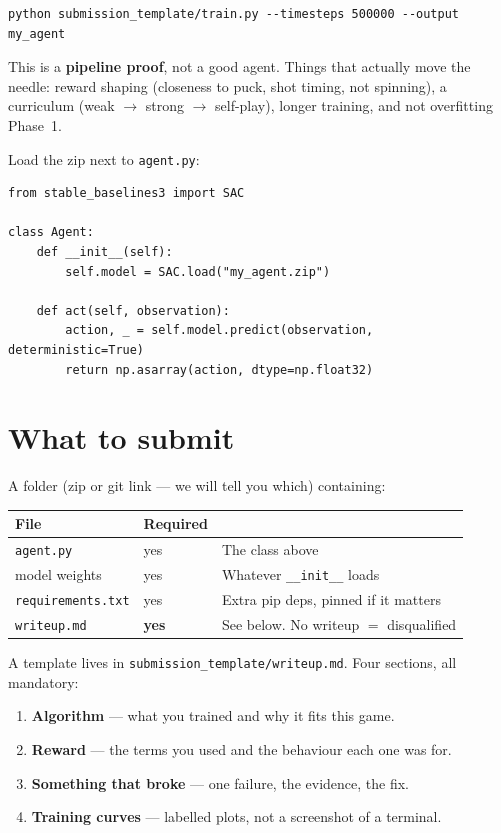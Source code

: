 \documentclass[11pt,a4paper]{article}
\begin{document}
\begin{lstlisting}
python submission_template/train.py --timesteps 500000 --output my_agent
\end{lstlisting}

This is a \textbf{pipeline proof}, not a good agent. Things that actually move the needle: reward shaping (closeness to puck, shot timing, not spinning), a curriculum (weak $\to$ strong $\to$ self-play), longer training, and not overfitting Phase~1.

Load the zip next to \texttt{agent.py}:

\begin{lstlisting}
from stable_baselines3 import SAC

class Agent:
    def __init__(self):
        self.model = SAC.load("my_agent.zip")

    def act(self, observation):
        action, _ = self.model.predict(observation, deterministic=True)
        return np.asarray(action, dtype=np.float32)
\end{lstlisting}

\section{What to submit}

A folder (zip or git link --- we will tell you which) containing:

\begin{center}
\begin{tabular}{@{}ll l@{}}
\toprule
\sffamily\bfseries File & \sffamily\bfseries Required & \sffamily\bfseries \\
\midrule
\texttt{agent.py}         & yes & The class above \\
model weights             & yes & Whatever \texttt{\_\_init\_\_} loads \\
\texttt{requirements.txt} & yes & Extra pip deps, pinned if it matters \\
\texttt{writeup.md}       & \textbf{yes} & See below. No writeup $=$ disqualified \\
\bottomrule
\end{tabular}
\end{center}

A template lives in \texttt{submission\_template/writeup.md}. Four sections, all mandatory:

\begin{enumerate}
  \item \textbf{Algorithm} --- what you trained and why it fits this game.
  \item \textbf{Reward} --- the terms you used and the behaviour each one was for.
  \item \textbf{Something that broke} --- one failure, the evidence, the fix.
  \item \textbf{Training curves} --- labelled plots, not a screenshot of a terminal.
\end{enumerate}
\end{document}
